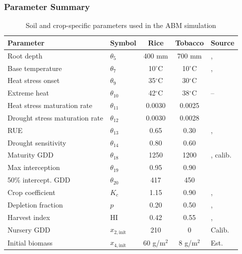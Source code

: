 \subsubsection{Parameter Summary}

\begin{table}[H]
\centering
\caption{Soil and crop-specific parameters used in the ABM simulation}
\label{tab:params}
\small
\begin{tabular}{llccl}
\toprule
\textbf{Parameter} & \textbf{Symbol} & \textbf{Rice} & \textbf{Tobacco} & \textbf{Source} \\
\midrule
Root depth & $\theta_5$ & 400 mm & 700 mm & \cite{allen1998}, \cite{fao_tobacco} \\
Base temperature & $\theta_7$ & 10$^{\circ}$C & 10$^{\circ}$C & \cite{laohasiriwong2023}, \cite{li2021} \\
Heat stress onset & $\theta_9$ & 35$^{\circ}$C & 30$^{\circ}$C & \cite{fao_tobacco} \\
Extreme heat & $\theta_{10}$ & 42$^{\circ}$C & 38$^{\circ}$C & -- \\
Heat stress maturation rate & $\theta_{11}$ & 0.0030 & 0.0025 & \cite{Lopezjimenez2024} \\
Drought stress maturation rate & $\theta_{12}$ & 0.0030 & 0.0028 & \cite{Lopezjimenez2024} \\
RUE & $\theta_{13}$ & 0.65 & 0.30 & \cite{patel2013}, \cite{ferrara2002} \\
Drought sensitivity & $\theta_{14}$ & 0.80 & 0.60 & \cite{Lopezjimenez2024} \\
Maturity GDD & $\theta_{18}$ & 1250 & 1200 & \cite{sadidi2021}, calib. \\
Max interception & $\theta_{19}$ & 0.95 & 0.90 & \cite{Lopezjimenez2024} \\
50\% intercept. GDD & $\theta_{20}$ & 417 & 450 & \cite{zhang2017} \\
Crop coefficient & $K_c$ & 1.15 & 0.90 & \cite{allen1998}, \cite{fao_tobacco} \\
Depletion fraction & $p$ & 0.20 & 0.50 & \cite{allen1998}, \cite{fao_tobacco} \\
Harvest index & HI & 0.42 & 0.55 & \cite{jalali2021}, \cite{fao_tobacco} \\
Nursery GDD & $x_{2,\text{init}}$ & 210 & 0 & Calib. \\
Initial biomass & $x_{4,\text{init}}$ & 60 g/m$^2$ & 8 g/m$^2$ & Est. \\
\bottomrule
\end{tabular}
\end{table}